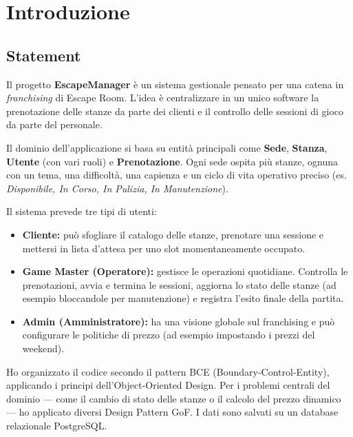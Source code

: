\chapter{Introduzione}

\section{Statement}
Il progetto \textbf{EscapeManager} è un sistema gestionale pensato per una catena in \textit{franchising} di Escape Room. L'idea è centralizzare in un unico software la prenotazione delle stanze da parte dei clienti e il controllo delle sessioni di gioco da parte del personale.

Il dominio dell'applicazione si basa su entità principali come \textbf{Sede}, \textbf{Stanza}, \textbf{Utente} (con vari ruoli) e \textbf{Prenotazione}. Ogni sede ospita più stanze, ognuna con un tema, una difficoltà, una capienza e un ciclo di vita operativo preciso (es. \textit{Disponibile, In Corso, In Pulizia, In Manutenzione}).

Il sistema prevede tre tipi di utenti:
\begin{itemize}
    \item \textbf{Cliente:} può sfogliare il catalogo delle stanze, prenotare una sessione e mettersi in lista d'attesa per uno slot momentaneamente occupato.
    \item \textbf{Game Master (Operatore):} gestisce le operazioni quotidiane. Controlla le prenotazioni, avvia e termina le sessioni, aggiorna lo stato delle stanze (ad esempio bloccandole per manutenzione) e registra l'esito finale della partita.
    \item \textbf{Admin (Amministratore):} ha una visione globale sul franchising e può configurare le politiche di prezzo (ad esempio impostando i prezzi del weekend).
\end{itemize}

Ho organizzato il codice secondo il pattern BCE (Boundary-Control-Entity), applicando i principi dell'Object-Oriented Design. Per i problemi centrali del dominio — come il cambio di stato delle stanze o il calcolo del prezzo dinamico — ho applicato diversi Design Pattern GoF. I dati sono salvati su un database relazionale PostgreSQL.


